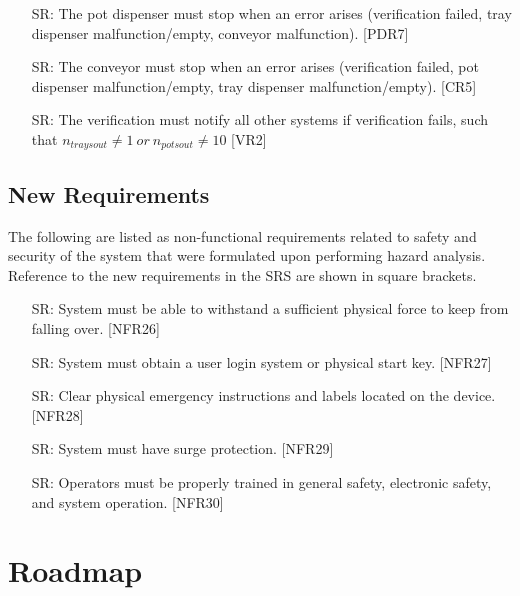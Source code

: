 \documentclass{article}
\newcounter{srreqnum} %
\begin{document}
\begin{itemize}
    \item[SR\refstepcounter{srreqnum}\thesrreqnum \label{SR10}:]
    The pot dispenser must stop when an error arises (verification failed, tray dispenser malfunction/empty, conveyor malfunction). [PDR7]
    \item[SR\refstepcounter{srreqnum}\thesrreqnum \label{SR11}:]
    The conveyor must stop when an error arises (verification failed, pot dispenser malfunction/empty, tray dispenser malfunction/empty). [CR5]
    \item[SR\refstepcounter{srreqnum}\thesrreqnum \label{SR12}:]
    {The verification must notify all other systems if verification fails, such that $n_{traysout}\neq1\ or\ n_{potsout}\neq10$ [VR2]}

    
  \end{itemize}

\subsection{New Requirements}
The following are listed as non-functional requirements related to 
safety and security of the system that were formulated upon performing 
hazard analysis. Reference to the new requirements in the SRS are shown in square brackets.\\

\begin{itemize}
    \item[SR\refstepcounter{srreqnum}\thesrreqnum \label{SR13}:]
    System must be able to withstand a sufficient physical force to keep from falling over. [NFR26]
    \item[SR\refstepcounter{srreqnum}\thesrreqnum \label{SR14}:]
    System must obtain a user login system or physical start key. [NFR27]
    \item[SR\refstepcounter{srreqnum}\thesrreqnum \label{SR15}:]
    Clear physical emergency instructions and labels located on the device. [NFR28]
    \item[SR\refstepcounter{srreqnum}\thesrreqnum \label{SR16}:]
    System must have surge protection. [NFR29]
    \item[SR\refstepcounter{srreqnum}\thesrreqnum \label{SR17}:]
    Operators must be properly trained in general safety, electronic safety, and system operation. [NFR30]
\end{itemize}

\section{Roadmap}
\end{document}
